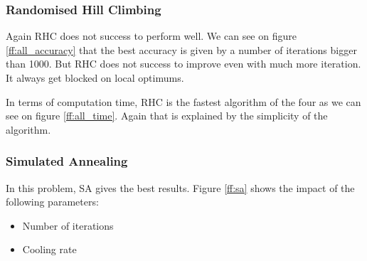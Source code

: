 \documentclass[10pt]{article}
\begin{document}
			\subsubsection*{Randomised Hill Climbing}
				Again RHC does not success to perform well. We can see on figure \ref{ff:all_accuracy} that the best accuracy is given by a number of iterations bigger than 1000. But RHC does not success to improve even with much more iteration. It always get blocked on local optimums.

				In terms of computation time, RHC is the fastest algorithm of the four as we can see on figure \ref{ff:all_time}. Again that is explained by the simplicity of the algorithm.
			\subsubsection*{Simulated Annealing}
				In this problem, SA gives the best results. Figure \ref{ff:sa} shows the impact of the following parameters:
				\begin{itemize}
					\item Number of iterations
					\item Cooling rate
				\end{itemize}
\end{document}
